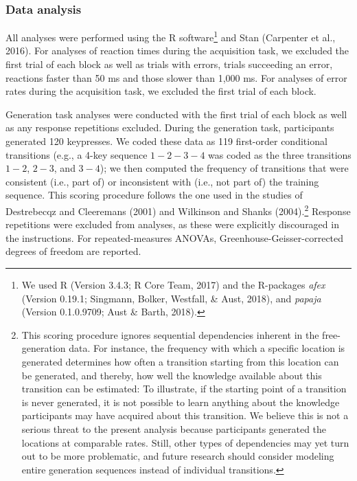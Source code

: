 \documentclass[floatsintext,doc]{apa6}
\theoremstyle{definition}
\theoremstyle{definition}
\theoremstyle{definition}
\theoremstyle{remark}
\begin{document}
\subsubsection{Data analysis}\label{data-analysis}

All analyses were performed using the R software\footnote{We used R
  (Version 3.4.3; R Core Team, 2017) and the R-packages \emph{afex}
  (Version 0.19.1; Singmann, Bolker, Westfall, \& Aust, 2018), and
  \emph{papaja} (Version 0.1.0.9709; Aust \& Barth, 2018).} and Stan
(Carpenter et al., 2016). For analyses of reaction times during the
acquisition task, we excluded the first trial of each block as well as
trials with errors, trials succeeding an error, reactions faster than 50
ms and those slower than 1,000 ms. For analyses of error rates during
the acquisition task, we excluded the first trial of each block.

Generation task analyses were conducted with the first trial of each
block as well as any response repetitions excluded. During the
generation task, participants generated 120 keypresses. We coded these
data as 119 first-order conditional transitions (e.g., a 4-key sequence
\(1{-}2{-}3{-}4\) was coded as the three transitions \(1{-}2\),
\(2{-}3\), and \(3{-}4\)); we then computed the frequency of transitions
that were consistent (i.e., part of) or inconsistent with (i.e., not
part of) the training sequence. This scoring procedure follows the one
used in the studies of Destrebecqz and Cleeremans (2001) and Wilkinson
and Shanks (2004).\footnote{This scoring procedure ignores sequential
  dependencies inherent in the free-generation data. For instance, the
  frequency with which a specific location is generated determines how
  often a transition starting from this location can be generated, and
  thereby, how well the knowledge available about this transition can be
  estimated: To illustrate, if the starting point of a transition is
  never generated, it is not possible to learn anything about the
  knowledge participants may have acquired about this transition. We
  believe this is not a serious threat to the present analysis because
  participants generated the locations at comparable rates. Still, other
  types of dependencies may yet turn out to be more problematic, and
  future research should consider modeling entire generation sequences
  instead of individual transitions.} Response repetitions were excluded
from analyses, as these were explicitly discouraged in the instructions.
For repeated-measures ANOVAs, Greenhouse-Geisser-corrected degrees of
freedom are reported.
\end{document}
